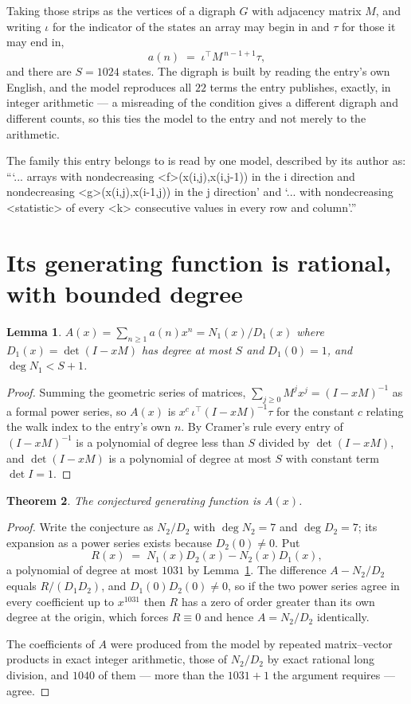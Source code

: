 \documentclass[11pt,a4paper]{article}
\theoremstyle{plain}
\newtheorem{theorem}{Theorem}
\newtheorem{lemma}[theorem]{Lemma}
\theoremstyle{definition}
\begin{document}
Taking those strips as the vertices of a digraph $G$ with adjacency matrix $M$, and writing
$\iota$ for the indicator of the states an array may begin in and $\tau$ for those it may end
in,
\[
a(n)\;=\;\iota^{\!\top}M^{\,n-1+1}\tau ,
\]
and there are $S=1024$ states. The digraph is built by reading the entry's own English, and the
model reproduces all $22$ terms the entry publishes, exactly, in integer arithmetic --- a
misreading of the condition gives a different digraph and different counts, so this ties the
model to the entry and not merely to the arithmetic.

The family this entry belongs to is read by one model, described by its author as: ```... arrays with nondecreasing <f>(x(i,j),x(i,j-1)) in the i direction and nondecreasing <g>(x(i,j),x(i-1,j)) in the j direction' and `... with nondecreasing <statistic> of every <k> consecutive values in every row and column'.''


\section{Its generating function is rational, with bounded degree}

\begin{lemma}\label{lem:rat}
$A(x)=\sum_{n\ge1}a(n)x^n=N_1(x)/D_1(x)$ where $D_1(x)=\det(I-xM)$ has degree at most
$S$ and $D_1(0)=1$, and $\deg N_1<S+1$.
\end{lemma}

\begin{proof}
Summing the geometric series of matrices, $\sum_{j\ge0}M^jx^j=(I-xM)^{-1}$ as a formal
power series, so $A(x)$ is $x^{c}\,\iota^{\!\top}(I-xM)^{-1}\tau$ for the constant $c$
relating the walk index to the entry's own $n$. By Cramer's rule every entry of
$(I-xM)^{-1}$ is a polynomial of degree less than $S$ divided by $\det(I-xM)$, and
$\det(I-xM)$ is a polynomial of degree at most $S$ with constant term $\det I=1$.
\end{proof}

\begin{theorem}
The conjectured generating function is $A(x)$.
\end{theorem}

\begin{proof}
Write the conjecture as $N_2/D_2$ with $\deg N_2=7$ and $\deg D_2=7$; its expansion as a
power series exists because $D_2(0)\neq0$. Put
\[
R(x)\;=\;N_1(x)D_2(x)-N_2(x)D_1(x),
\]
a polynomial of degree at most $1031$ by Lemma~\ref{lem:rat}. The difference
$A-N_2/D_2$ equals $R/(D_1D_2)$, and $D_1(0)D_2(0)\neq0$, so if the two power series agree in
every coefficient up to $x^{1031}$ then $R$ has a zero of order greater than its own
degree at the origin, which forces $R\equiv0$ and hence $A=N_2/D_2$ identically.

The coefficients of $A$ were produced from the model by repeated matrix--vector products in
exact integer arithmetic, those of $N_2/D_2$ by exact rational long division, and $1040$
of them --- more than the $1031+1$ the argument requires --- agree.
\end{proof}
\end{document}
